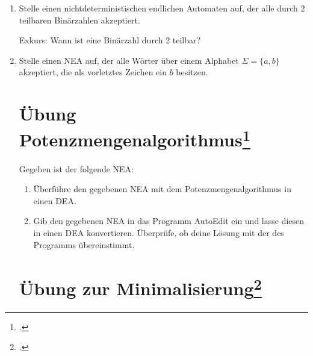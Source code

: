 \documentclass{lehramt-informatik-aufgabe}
\begin{document}
\begin{enumerate}
\item Stelle einen nichtdeterministischen endlichen Automaten auf, der
alle durch 2 teilbaren Binärzahlen akzeptiert.

Exkurs: Wann ist eine Binärzahl durch 2 teilbar?

\item Stelle einen NEA auf, der alle Wörter über einem Alphabet $\Sigma
= \{a,b\}$ akzeptiert, die als vorletztes Zeichen ein $b$ besitzen.

%

\section{Übung Potenzmengenalgorithmus\footcite[Seite 46]{theoinf:fs:1}}

Gegeben ist der folgende NEA:

\begin{center}
\end{center}

\begin{enumerate}
\item Überführe den gegebenen NEA mit dem Potenzmengenalgorithmus in
einen DEA.

\item Gib den gegebenen NEA in das Programm AutoEdit ein und lasse
diesen in einen DEA konvertieren. Überprüfe, ob deine Lösung mit der des
Programms übereinstimmt.
\end{enumerate}

%

\section{Übung zur Minimalisierung\footcite[Seite 59]{theoinf:fs:1}}


\end{enumerate}
\end{document}
